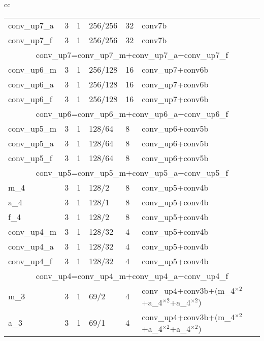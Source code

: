 \begin{table*}[thb]
{\begin{tabular}{cc}
\begin{tabular}[t]{|*{6}{l|}}
            conv\_up7\_a & 3     & 1     & 256/256   & 32  & conv7b \\
            conv\_up7\_f & 3     & 1     & 256/256   & 32  & conv7b \\
            \hline 
            \multicolumn{6}{|c|}{conv\_up7=conv\_up7\_m+conv\_up7\_a+conv\_up7\_f} \\
            \hline
            conv\_up6\_m & 3     & 1     & 256/128   & 16  & conv\_up7+conv6b\\
            conv\_up6\_a & 3     & 1     & 256/128   & 16  & conv\_up7+conv6b\\
            conv\_up6\_f & 3     & 1     & 256/128   & 16  & conv\_up7+conv6b\\
            \hline 
            \multicolumn{6}{|c|}{conv\_up6=conv\_up6\_m+conv\_up6\_a+conv\_up6\_f} \\
            \hline
            conv\_up5\_m & 3     & 1     & 128/64    & 8   & conv\_up6+conv5b \\
            conv\_up5\_a & 3     & 1     & 128/64    & 8   & conv\_up6+conv5b \\
            conv\_up5\_f & 3     & 1     & 128/64    & 8   & conv\_up6+conv5b \\
            \hline
            \multicolumn{6}{|c|}{conv\_up5=conv\_up5\_m+conv\_up5\_a+conv\_up5\_f} \\
            \hline
            m\_4         & 3     & 1     & 128/2     & 8   & conv\_up5+conv4b \\
            a\_4         & 3     & 1     & 128/1     & 8   & conv\_up5+conv4b \\
            f\_4         & 3     & 1     & 128/2     & 8   & conv\_up5+conv4b \\
            conv\_up4\_m & 3     & 1     & 128/32    & 4   & conv\_up5+conv4b \\
            conv\_up4\_a & 3     & 1     & 128/32    & 4   & conv\_up5+conv4b \\
            conv\_up4\_f & 3     & 1     & 128/32    & 4   & conv\_up5+conv4b \\
            \hline
            \multicolumn{6}{|c|}{conv\_up4=conv\_up4\_m+conv\_up4\_a+conv\_up4\_f} \\
            \hline
            m\_3         & 3     & 1     & 69/2      & 4   & conv\_up4+conv3b+(m\_4$^{\times 2}$+a\_4$^{\times 2}$+a\_4$^{\times 2}$) \\
            a\_3         & 3     & 1     & 69/1      & 4   & conv\_up4+conv3b+(m\_4$^{\times 2}$+a\_4$^{\times 2}$+a\_4$^{\times 2}$) \\

\end{tabular}
\end{tabular}}
\end{table*}
